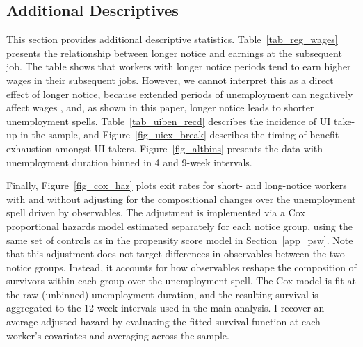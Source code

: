 \documentclass{div}
\begin{document}
\subsection{Additional Descriptives}

This section provides additional descriptive statistics. Table~\ref{tab_reg_wages} presents the relationship between longer notice and earnings at the subsequent job. The table shows that workers with longer notice periods tend to earn higher wages in their subsequent jobs. However, we cannot interpret this as a direct effect of longer notice, because extended periods of unemployment can negatively affect wages \citep{SchmiederEtAl2016}, and, as shown in this paper, longer notice leads to shorter unemployment spells. Table~\ref{tab_uiben_recd} describes the incidence of UI take-up in the sample, and Figure~\ref{fig_uiex_break} describes the timing of benefit exhaustion amongst UI takers. Figure~\ref{fig_altbins} presents the data with unemployment duration binned in 4 and 9-week intervals.

Finally, Figure~\ref{fig_cox_haz} plots exit rates for short- and long-notice workers with and without adjusting for the compositional changes over the unemployment spell driven by observables. The adjustment is implemented via a Cox proportional hazards model estimated separately for each notice group, using the same set of controls as in the propensity score model in Section~\ref{app_psw}. Note that this adjustment does not target differences in observables between the two notice groups. Instead, it accounts for how observables reshape the composition of survivors within each group over the unemployment spell. The Cox model is fit at the raw (unbinned) unemployment duration, and the resulting survival is aggregated to the 12-week intervals used in the main analysis. I recover an average adjusted hazard by evaluating the fitted survival function at each worker's covariates and averaging across the sample.

\end{document}
